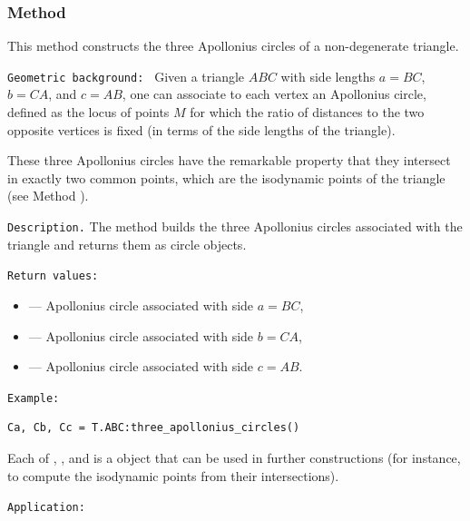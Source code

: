 \subsubsection{Method }
\label{ssub:three_apollonius_circles}

This method constructs the three Apollonius circles of a non-degenerate triangle.

\medskip
\texttt{Geometric background: }
Given a triangle $ABC$ with side lengths $a = BC$, $b = CA$, and $c = AB$, one can
associate to each vertex an Apollonius circle, defined as the locus of points $M$
for which the ratio of distances to the two opposite vertices is fixed
(in terms of the side lengths of the triangle).

These three Apollonius circles have the remarkable property that they intersect
in exactly two common points, which are the isodynamic points of the triangle
(see Method ).

\medskip
\texttt{Description.}
The method  builds the three Apollonius circles
associated with the triangle and returns them as circle objects.

\medskip
\texttt{Return values: }
\begin{itemize}
  \item {} — Apollonius circle associated with side $a = BC$,
  \item {} — Apollonius circle associated with side $b = CA$,
  \item {} — Apollonius circle associated with side $c = AB$.
\end{itemize}

\medskip
\texttt{Example: }
\begin{verbatim}
Ca, Cb, Cc = T.ABC:three_apollonius_circles()
\end{verbatim}

Each of , , and  is a  object that can be
used in further constructions (for instance, to compute the isodynamic points
from their intersections).

\medskip
\texttt{Application: }

\begin{tkzexample}[vbox]
\begin{center}
\end{center}
\end{tkzexample}

